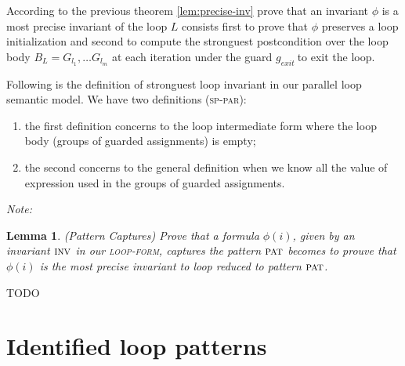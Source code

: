 \documentclass[a4paper,10pt]{article}
\newcommand{\idx}{\ensuremath{i}\xspace}
\newcommand{\gexit}{\ensuremath{\mathit{g_{exit}~}}}
\newcommand{\Inv}[1]{\ensuremath{\mathit{Inv}(#1)\xspace}}
\newcommand{\inv}{\ensuremath{\textsc{inv}}\xspace}
\newcommand{\pat}{\ensuremath{\textsc{pat}}\xspace}
\newcommand{\loopform}{\textsc{loop-form}\xspace}
\newcommand{\loopinvariant}{\noindent\textit{Loop invariant:}\xspace}
\newcommand{\patterndef}{\noindent\textit{Definition:}\xspace}
\newcommand{\patternnote}{\noindent\textit{Note:}\xspace}
\newcommand{\symdef}{\ensuremath{\overset{\mathit{def}}{=}}}
\newcommand{\sppar}{\textsc{sp-par}\xspace}
\newtheorem{lemma}[theorem]{Lemma}
\newcounter{proofnum} %
\newcounter{pc} %
\newcommand{\curpattern}{\ensuremath{\textsc{pat}\mathrm{\arabic{pc}}}\xspace}
\newcommand{\curinv}{\ensuremath{\textsc{inv}\mathrm{\arabic{pc}}}\xspace}
\newenvironment{proof}[1][Proof.]{\refstepcounter{proofnum}\begin{trivlist}
\item[\hskip \labelsep {\bfseries #1}]}{\end{trivlist}}
\begin{document}
According to the previous theorem \ref{lem:precise-inv} prove that an invariant $\phi$ 
is a most precise invariant of the loop $L$ consists first to prove that $\phi$ preserves 
a loop initialization and second to compute the stronguest postcondition over the loop body 
$B_L = G_{l_1}, \ldots G_{l_m}$ at each iteration under the guard \gexit to exit the loop.

\vspace{0.5 cm}
Following is the definition of stronguest loop invariant in our parallel loop semantic model.
We have two definitions (\sppar): 
\begin{enumerate}
 \item the first definition concerns to the loop intermediate form 
where the loop body (groups of guarded assignments) is empty;
 \item the second concerns to the general definition when we know 
all the value of expression used in the groups of guarded assignments. 
\end{enumerate}

\patternnote

\begin{lemma}
\label{lem:pattern-captures}
  \emph{(Pattern Captures)} Prove that a formula $\phi(i)$, given by an invariant \inv
  in  our \loopform, captures the pattern \pat becomes to prouve that $\phi(i)$ is the 
  most precise invariant to loop reduced to pattern \pat.
\end{lemma}

\begin{proof}
 TODO
\end{proof}


\section{Identified loop patterns} 
\label{sec:list-loop-patterns}

\newcommand{\pattern}[3]{%
\refstepcounter{pc}
\patterndef #1
%
\begin{equation}
  \begin{array}{cccc} #2 \end{array} \tag{\curpattern}
\end{equation}
%
\loopinvariant
%
\begin{equation}
  \Inv{\idx} \symdef \begin{array}{cccc} #3 \end{array} \tag{\curinv}
\end{equation}
}
\end{document}
